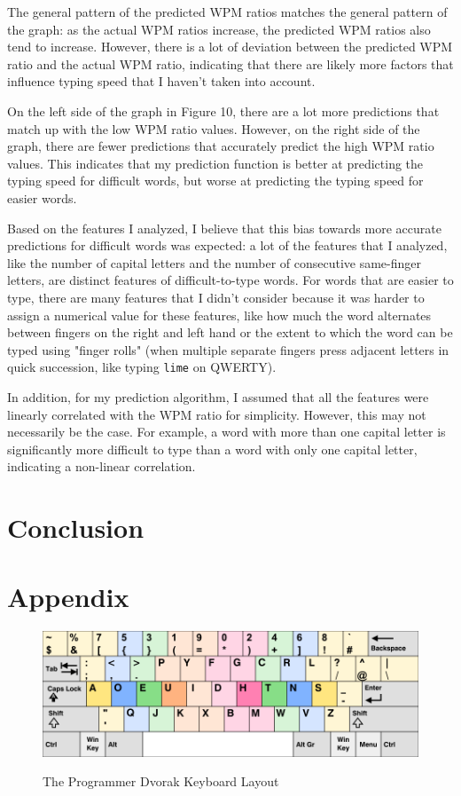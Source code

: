 \documentclass[12pt]{article}
\newcommand{\code}[1]{\texttt{#1}}
\begin{document}
The general pattern of the predicted WPM ratios matches the general pattern of the graph: as the actual WPM ratios increase, the predicted WPM ratios also tend to increase. However, there is a lot of deviation between the predicted WPM ratio and the actual WPM ratio, indicating that there are likely more factors that influence typing speed that I haven't taken into account.

On the left side of the graph in Figure 10, there are a lot more predictions that match up with the low WPM ratio values. However, on the right side of the graph, there are fewer predictions that accurately predict the high WPM ratio values. This indicates that my prediction function is better at predicting the typing speed for difficult words, but worse at predicting the typing speed for easier words.

Based on the features I analyzed, I believe that this bias towards more accurate predictions for difficult words was expected: a lot of the features that I analyzed, like the number of capital letters and the number of consecutive same-finger letters, are distinct features of difficult-to-type words. For words that are easier to type, there are many features that I didn't consider because it was harder to assign a numerical value for these features, like how much the word alternates between fingers on the right and left hand or the extent to which the word can be typed using "finger rolls" (when multiple separate fingers press adjacent letters in quick succession, like typing \code{lime} on QWERTY).

In addition, for my prediction algorithm, I assumed that all the features were linearly correlated with the WPM ratio for simplicity. However, this may not necessarily be the case. For example, a word with more than one capital letter is significantly more difficult to type than a word with only one capital letter, indicating a non-linear correlation.

\section*{Conclusion}

\section*{Appendix}

\begin{figure}[H]
	\caption{The Programmer Dvorak Keyboard Layout}
	\includegraphics[width=\textwidth]{programmer-dvorak.png}
	\label{fig:programmer-dvorak}
\end{figure}
\end{document}
